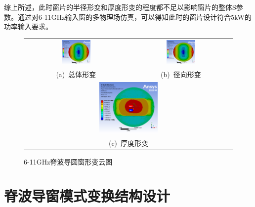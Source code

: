 \documentclass[master]{thesis-uestc}
\begin{document}
综上所述，此时窗片的半径形变和厚度形变的程度都不足以影响窗片的整体S参数。通过对6-11GHz输入窗的多物理场仿真，可以得知此时的窗片设计符合5kW的功率输入要求。
\begin{figure}[!htb]
    \small
    \centering
    \begin{tabular}{@{\ }c@{\ }c}
        \includegraphics[width=0.29\textwidth]{pic/chapter3/X输入窗总形变.png} & 
        \hspace{5pt}
        \includegraphics[width=0.29\textwidth]{pic/chapter3/X输入窗径向形变.png}     \\
        \mbox{\small (a) 总体形变}                                                                               & 
        \mbox{\small (b) 径向形变}                                                           \\[6bp]
        \multicolumn{2}{c}{\includegraphics[width=0.29\textwidth]{pic/chapter3/X输入窗厚度形变.png}} \\  %
        \multicolumn{2}{c}{\mbox{\small (c) 厚度形变}}             
    \end{tabular}
    \caption{6-11GHz脊波导圆窗形变云图}
    \label{fig:X输入窗形变}
\end{figure}
        
\section{脊波导窗模式变换结构设计}
\end{document}
